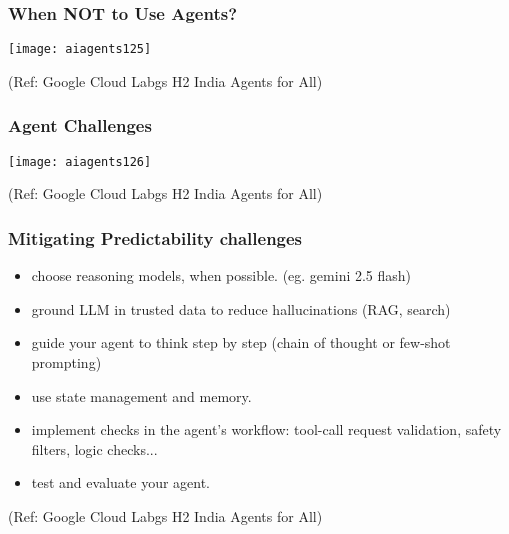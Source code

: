 \begin{frame}[fragile]\frametitle{When NOT to Use Agents?}
	
		\begin{center}
		\texttt{[image: aiagents125]}
		
		{\tiny (Ref: Google Cloud Labgs H2 India Agents for All)}
		\end{center}	
\end{frame}

\begin{frame}[fragile]\frametitle{Agent Challenges}
	
		\begin{center}
		\texttt{[image: aiagents126]}
		
		{\tiny (Ref: Google Cloud Labgs H2 India Agents for All)}
		\end{center}	
\end{frame}

\begin{frame}[fragile]\frametitle{Mitigating Predictability challenges}
    \begin{itemize}
        \item choose reasoning models, when possible. (eg. gemini 2.5 flash)
        \item ground LLM in trusted data to reduce hallucinations (RAG, search)
        \item guide your agent to think step by step (chain of thought or few-shot prompting) 
        \item use state management and memory. 
        \item implement checks in the agent’s workflow: tool-call request validation, safety filters, logic checks...
        \item test and evaluate your agent.
    \end{itemize}
	
		{\tiny (Ref: Google Cloud Labgs H2 India Agents for All)}

\end{frame}

